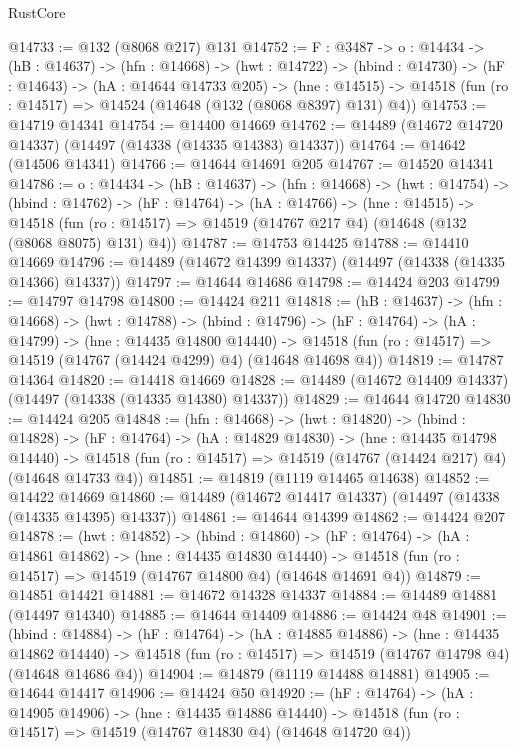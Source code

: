 \begin{lexlean}{RustCore}
\begin{coremodule}
@14733 := @132 (@8068 @217) @131
@14752 := {F : @3487} ->
  {o : @14434} ->
  (hB : @14637) ->
  (hfn : @14668) ->
  (hwt : @14722) ->
  (hbind : @14730) ->
  (hF : @14643) ->
  (hA : @14644 @14733 @205) ->
  (hne : @14515) -> @14518 (fun (ro : @14517) => @14524 (@14648 (@132 (@8068 @8397) @131) @4))
@14753 := @14719 @14341
@14754 := @14400 @14669
@14762 := @14489 (@14672 @14720 @14337) (@14497 (@14338 (@14335 @14383) @14337))
@14764 := @14642 (@14506 @14341)
@14766 := @14644 @14691 @205
@14767 := @14520 @14341
@14786 := {o : @14434} ->
  (hB : @14637) ->
  (hfn : @14668) ->
  (hwt : @14754) ->
  (hbind : @14762) ->
  (hF : @14764) ->
  (hA : @14766) ->
  (hne : @14515) ->
  @14518 (fun (ro : @14517) => @14519 (@14767 @217 @4) (@14648 (@132 (@8068 @8075) @131) @4))
@14787 := @14753 @14425
@14788 := @14410 @14669
@14796 := @14489 (@14672 @14399 @14337) (@14497 (@14338 (@14335 @14366) @14337))
@14797 := @14644 @14686
@14798 := @14424 @203
@14799 := @14797 @14798
@14800 := @14424 @211
@14818 := (hB : @14637) ->
  (hfn : @14668) ->
  (hwt : @14788) ->
  (hbind : @14796) ->
  (hF : @14764) ->
  (hA : @14799) ->
  (hne : @14435 @14800 @14440) ->
  @14518 (fun (ro : @14517) => @14519 (@14767 (@14424 @4299) @4) (@14648 @14698 @4))
@14819 := @14787 @14364
@14820 := @14418 @14669
@14828 := @14489 (@14672 @14409 @14337) (@14497 (@14338 (@14335 @14380) @14337))
@14829 := @14644 @14720
@14830 := @14424 @205
@14848 := (hfn : @14668) ->
  (hwt : @14820) ->
  (hbind : @14828) ->
  (hF : @14764) ->
  (hA : @14829 @14830) ->
  (hne : @14435 @14798 @14440) ->
  @14518 (fun (ro : @14517) => @14519 (@14767 (@14424 @217) @4) (@14648 @14733 @4))
@14851 := @14819 (@1119 @14465 @14638)
@14852 := @14422 @14669
@14860 := @14489 (@14672 @14417 @14337) (@14497 (@14338 (@14335 @14395) @14337))
@14861 := @14644 @14399
@14862 := @14424 @207
@14878 := (hwt : @14852) ->
  (hbind : @14860) ->
  (hF : @14764) ->
  (hA : @14861 @14862) ->
  (hne : @14435 @14830 @14440) ->
  @14518 (fun (ro : @14517) => @14519 (@14767 @14800 @4) (@14648 @14691 @4))
@14879 := @14851 @14421
@14881 := @14672 @14328 @14337
@14884 := @14489 @14881 (@14497 @14340)
@14885 := @14644 @14409
@14886 := @14424 @48
@14901 := (hbind : @14884) ->
  (hF : @14764) ->
  (hA : @14885 @14886) ->
  (hne : @14435 @14862 @14440) ->
  @14518 (fun (ro : @14517) => @14519 (@14767 @14798 @4) (@14648 @14686 @4))
@14904 := @14879 (@1119 @14488 @14881)
@14905 := @14644 @14417
@14906 := @14424 @50
@14920 := (hF : @14764) ->
  (hA : @14905 @14906) ->
  (hne : @14435 @14886 @14440) ->
  @14518 (fun (ro : @14517) => @14519 (@14767 @14830 @4) (@14648 @14720 @4))

\end{coremodule}
\end{lexlean}
